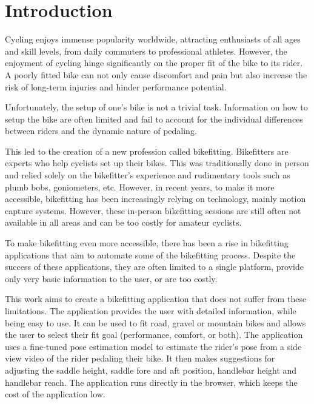 
% 

\chapter{Introduction}
Cycling enjoys immense popularity worldwide, attracting enthusiasts of all ages and skill levels, from daily commuters to professional athletes. However, the enjoyment of cycling hinge significantly on the proper fit of the bike to its rider. A poorly fitted bike can not only cause discomfort and pain but also increase the risk of long-term injuries and hinder performance potential.

Unfortunately, the setup of one's bike is not a trivial task. Information on how to setup the bike are often limited and fail to account for the individual differences between riders and the dynamic nature of pedaling.

This led to the creation of a new profession called bikefitting. Bikefitters are experts who help cyclists set up their bikes. This was traditionally done in person and relied solely on the bikefitter's experience and rudimentary tools such as plumb bobs, goniometers, etc. However, in recent years, to make it more accessible, bikefitting has been increasingly relying on technology, mainly motion capture systems. However, these in-person bikefitting sessions are still often not available in all areas and can be too costly for amateur cyclists.

To make bikefitting even more accessible, there has been a rise in bikefitting applications that aim to automate some of the bikefitting process. Despite the success of these applications, they are often limited to a single platform, provide only very basic information to the user, or are too costly.

This work aims to create a bikefitting application that does not suffer from these limitations. The application provides the user with detailed information, while being easy to use. It can be used to fit road, gravel or mountain bikes and allows the user to select their fit goal (performance, comfort, or both). The application uses a fine-tuned pose estimation model to estimate the rider's pose from a side view video of the rider pedaling their bike. It then makes suggestions for adjusting the saddle height, saddle fore and aft position, handlebar height and handlebar reach. The application runs directly in the browser, which keeps the cost of the application low.

